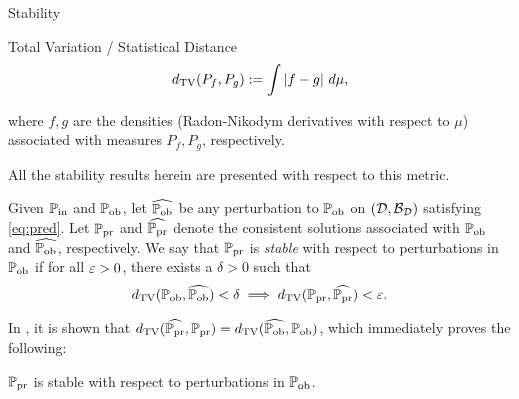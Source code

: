 \begin{frame}[t]{Stability}

\begin{defn}{Total Variation / Statistical Distance}
	\begin{equation}\label{eq:tv}
		d_{\text{TV}} (P_f, P_g) := \int \left\vert f - g\right\vert \, d\mu,
	\end{equation}
\end{defn}
where $f,g$ are the densities (Radon-Nikodym derivatives with respect to $\mu$) associated with measures $P_f, P_g$, respectively.

All the stability results herein are presented with respect to this metric.
\end{frame}

\begin{frame}[t]

\begin{defn}\label{defn:stableobs}
Given $\operatorname*{\mathbb{P}_{in}}$ and $\operatorname*{\mathbb{P}_{ob}}$, let $\widehat{\operatorname*{\mathbb{P}_{ob}}}$ be any perturbation to $\operatorname*{\mathbb{P}_{ob}}$ on $(\mathcal{D}, \mathcal{B}_{\mathcal{D}})$ satisfying \eqref{eq:pred}.
Let $\operatorname*{\mathbb{P}_{pr}}$ and $\widehat{\operatorname*{\mathbb{P}_{pr}}}$ denote the consistent solutions associated with $\operatorname*{\mathbb{P}_{ob}}$ and $\widehat{\operatorname*{\mathbb{P}_{ob}}}$, respectively.
We say that $\operatorname*{\mathbb{P}_{pr}}$ is \emph{stable} with respect to perturbations in $\operatorname*{\mathbb{P}_{ob}}$ if for all $\varepsilon > 0$, there exists a $\delta > 0$ such that
\begin{equation}
d_{\text{TV}} (\operatorname*{\mathbb{P}_{ob}}, \widehat{\operatorname*{\mathbb{P}_{ob}}}) < \delta \implies d_{\text{TV}} (\operatorname*{\mathbb{P}_{pr}}, \widehat{\operatorname*{\mathbb{P}_{pr}}}) < \varepsilon.
\end{equation}
\end{defn}

In \cite{BJW18}, it is shown that $d_{\text{TV}} (\widehat{\operatorname*{\mathbb{P}_{pr}}}, \operatorname*{\mathbb{P}_{pr}}) = d_{\text{TV}} (\widehat{\operatorname*{\mathbb{P}_{ob}}}, \operatorname*{\mathbb{P}_{ob}})$, which immediately proves the following:

\begin{theorem}
$\operatorname*{\mathbb{P}_{pr}}$ is stable with respect to perturbations in $\operatorname*{\mathbb{P}_{ob}}$.
\end{theorem}

\end{frame}


